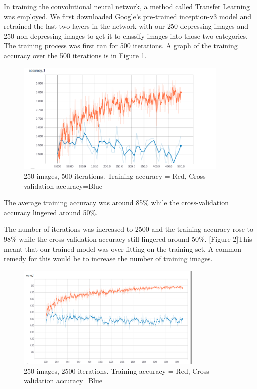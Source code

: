 \documentclass[letterpaper]{article}
\begin{document}
In training the convolutional neural network, a method called Transfer Learning was employed. We first downloaded Google's pre-trained inception-v3 model and retrained the last two layers in the network with our 250 depressing images and 250 non-depressing images to get it to classify images into those two categories. The training process was first ran for 500 iterations. A graph of the training accuracy over the 500 iterations is in Figure 1.

\begin{figure}[!htb]
	\begin{center}
		\includegraphics[width=4in]{250_img_500_it_accuracy.png}
		\caption{250 images, 500 iterations. Training accuracy = Red, Cross-validation accuracy=Blue}
		\label{fig1}
	\end{center}
\end{figure}

The average training accuracy was around 85\% while the cross-validation accuracy lingered around 50\%.

The number of iterations was increased to 2500 and the training accuracy rose to 98\% while the cross-validation accuracy still lingered around 50\%. [Figure 2]This meant that our trained model was over-fitting on the training set. A common remedy for this would be to increase the number of training images.\\


\begin{figure}[!htb]
	\begin{center}
		\includegraphics[width=3.5in]{250_img_2500_it_accuracy.png}
		\caption{250 images, 2500 iterations. Training accuracy = Red, Cross-validation accuracy=Blue}
		\label{fig2}
	\end{center}
\end{figure}
\end{document}
